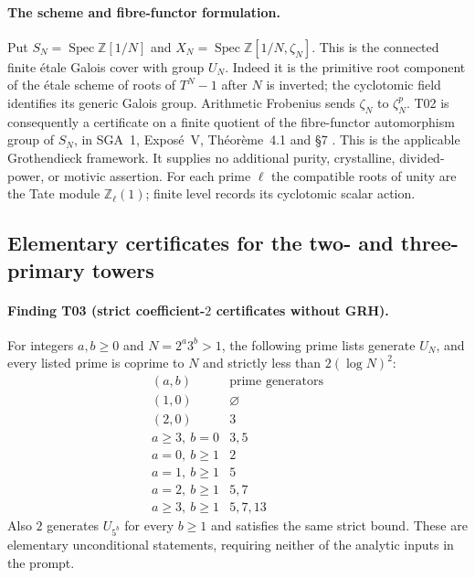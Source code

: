 \documentclass[11pt,a4paper]{article}
\begin{document}
\paragraph{The scheme and fibre-functor formulation.}
Put $S_N=\operatorname{Spec}\mathbb Z[1/N]$ and
$X_N=\operatorname{Spec}\mathbb Z[1/N,\zeta_N]$. This is the connected
finite \'etale Galois cover with group $U_N$. Indeed it is the primitive
root component of the \'etale scheme of roots of $T^N-1$ after $N$ is
inverted; the cyclotomic field identifies its generic Galois group.
Arithmetic Frobenius sends $\zeta_N$ to $\zeta_N^p$. T02 is consequently
a certificate on a finite quotient of the fibre-functor automorphism
group of $S_N$, in SGA~1, Expos\'e~V, Th\'eor\`eme~4.1 and \S7
\cite{SGA1}. This is the applicable Grothendieck framework. It supplies
no additional purity, crystalline, divided-power, or motivic assertion.
For each prime $\ell$ the compatible roots of unity are the Tate module
$\mathbb Z_\ell(1)$; finite level records its cyclotomic scalar action.

\subsection{Elementary certificates for the two- and three-primary towers}

\paragraph{Finding T03 (strict coefficient-$2$ certificates without GRH).}
For integers $a,b\geq0$ and $N=2^a3^b>1$, the following prime lists generate $U_N$, and every
listed prime is coprime to $N$ and strictly less than $2(\log N)^2$:
\[
\begin{array}{c|c}
 (a,b)&\text{prime generators}\\\hline
 (1,0)&\varnothing\\
 (2,0)&3\\
 a\geq3,\ b=0&3,5\\
 a=0,\ b\geq1&2\\
 a=1,\ b\geq1&5\\
 a=2,\ b\geq1&5,7\\
 a\geq3,\ b\geq1&5,7,13
\end{array}
 \tag{T03}
\]
Also $2$ generates $U_{5^b}$ for every $b\geq1$ and satisfies the same
strict bound. These are elementary unconditional statements, requiring
neither of the analytic inputs in the prompt.
\end{document}
